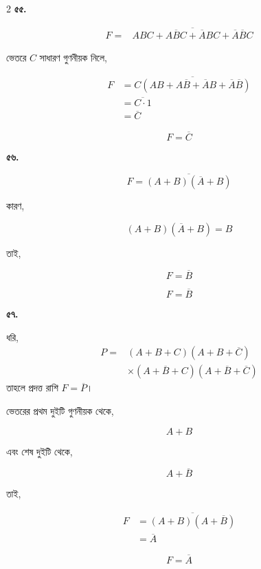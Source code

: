 \begin{multicols}{2}
\textbf{৫৫.}

\[
\begin{aligned}
F
={}&\overline{
ABC+A\overline BC
+\overline ABC
+\overline A\overline BC
}
\end{aligned}
\]

ভেতরে \(C\) সাধারণ গুণনীয়ক নিলে,

\[
\begin{aligned}
F
&=\overline{
C(AB+A\overline B
+\overline AB+\overline A\overline B)
}\\
&=\overline{C\cdot1}\\
&=\overline C
\end{aligned}
\]

\[
\boxed{F=\overline C}
\]

\medskip


\textbf{৫৬.}

\[
F=\overline{(A+B)(\overline A+B)}
\]

কারণ,

\[
(A+B)(\overline A+B)=B
\]

তাই,

\[
F=\overline B
\]

\[
\boxed{F=\overline B}
\]

\medskip


\textbf{৫৭.}

ধরি,
\[\begin{aligned}
P={}&(A+B+C)(A+B+\overline C)\\
&\times(A+\overline B+C)(A+\overline B+\overline C)
\end{aligned}\]
তাহলে প্রদত্ত রাশি \(F=\overline P\)।

ভেতরের প্রথম দুইটি গুণনীয়ক থেকে,

\[
A+B
\]

এবং শেষ দুইটি থেকে,

\[
A+\overline B
\]

তাই,

\[
\begin{aligned}
F
&=\overline{(A+B)(A+\overline B)}\\
&=\overline A
\end{aligned}
\]

\[
\boxed{F=\overline A}
\]


\end{multicols}
